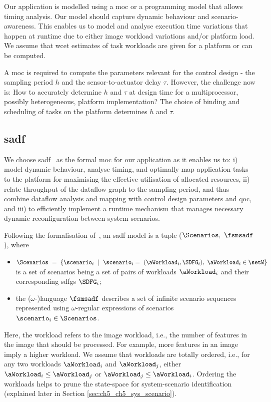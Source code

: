 Our application is modelled using a \gls{moc} or a programming model that allows timing analysis.  
Our model should capture dynamic behaviour and scenario-awareness. 
This enables us to model and analyse execution time variations that happen at runtime due to either image workload variations and/or platform load. 
We assume that \gls{wcet} estimates of task workloads are given for a platform or can be computed.

A \gls{moc} is required to compute the parameters relevant for the control design - the sampling period $h$ and the sensor-to-actuator delay $\tau$.
However, the challenge now is: How to accurately determine $h$ and $\tau$ at design time for a multiprocessor, possibly heterogeneous, platform implementation?
The choice of binding and scheduling of tasks on the platform determines $h$ and $\tau$.

\subsection{\Acrfull{sadf}}
\label{sec:ch5_sadf}
We choose \gls{sadf}~\cite{theelen2006scenario} as the
formal \gls{moc} for our application as it enables us to: i) model dynamic behaviour, analyse timing, and optimally map application tasks to the platform for maximising the effective utilisation of allocated resources, ii) relate throughput of the dataflow graph to the sampling period, and thus combine dataflow analysis and mapping with control design parameters and \gls{qoc}, and iii) to efficiently implement a runtime mechanism that manages necessary dynamic reconfiguration between system scenarios.

Following the formalisation of~\cite{ara2018scalable}, an \gls{sadf} model is a tuple
($\Scenarios,\ \fsmsadf$), where
\begin{itemize}
  \item $\Scenarios \ =\ \{\scenario_i\ \mid\ \scenario_i =\ (\aWorkload_i,\SDFG_{i}),\ \aWorkload_i \in \setW\}$ is a set of scenarios being a set of pairs of workloads $\aWorkload_i$ and their corresponding \glspl{sdfg} $\SDFG_{i}$;
  \item the ($\omega$-)language $\fsmsadf$ describes a set of infinite scenario sequences represented using $\omega$-regular expressions of scenarios $\scenario_i \in \Scenarios$.
\end{itemize}

Here, the workload refers to the image workload, i.e., the number of features in the image that should be processed. For example, more features in an image imply a higher workload.
We assume that workloads are totally ordered, i.e., for any two workloads $\aWorkload_i$ and $\aWorkload_j$, either $\aWorkload_i\leq \aWorkload_j$ or $\aWorkload_j\leq \aWorkload_i$.
Ordering the workloads helps to prune the state-space for system-scenario identification (explained later in Section \ref{sec:ch5_ch5_sys_scenario}).

